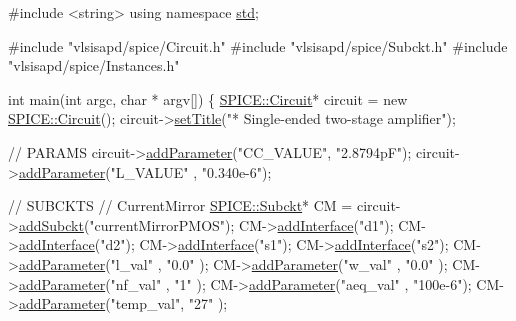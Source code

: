 \begin{DoxyCodeInclude}
\textcolor{preprocessor}{#include <string>}
\textcolor{keyword}{using namespace }\hyperlink{namespacestd}{std};

\textcolor{preprocessor}{#include "vlsisapd/spice/Circuit.h"}
\textcolor{preprocessor}{#include "vlsisapd/spice/Subckt.h"}
\textcolor{preprocessor}{#include "vlsisapd/spice/Instances.h"}

\textcolor{keywordtype}{int} main(\textcolor{keywordtype}{int} argc, \textcolor{keywordtype}{char} * argv[]) \{
    \hyperlink{class_s_p_i_c_e_1_1_circuit}{SPICE::Circuit}* circuit = \textcolor{keyword}{new} \hyperlink{class_s_p_i_c_e_1_1_circuit}{SPICE::Circuit}();
    circuit->\hyperlink{class_s_p_i_c_e_1_1_circuit_a798df9ebd558e22c85eeceb5202e3123}{setTitle}(\textcolor{stringliteral}{"* Single-ended two-stage amplifier"});

    \textcolor{comment}{// PARAMS}
    circuit->\hyperlink{class_s_p_i_c_e_1_1_circuit_ab3ab147a16bc490ce96db905a4ca271c}{addParameter}(\textcolor{stringliteral}{"CC\_VALUE"}, \textcolor{stringliteral}{"2.8794pF"});
    circuit->\hyperlink{class_s_p_i_c_e_1_1_circuit_ab3ab147a16bc490ce96db905a4ca271c}{addParameter}(\textcolor{stringliteral}{"L\_VALUE"} , \textcolor{stringliteral}{"0.340e-6"});

    \textcolor{comment}{// SUBCKTS}
    \textcolor{comment}{// CurrentMirror}
    \hyperlink{class_s_p_i_c_e_1_1_subckt}{SPICE::Subckt}* CM = circuit->\hyperlink{class_s_p_i_c_e_1_1_circuit_a0d1352e46d4537ce1e5f651de40e91a6}{addSubckt}(\textcolor{stringliteral}{"currentMirrorPMOS"});
    CM->\hyperlink{class_s_p_i_c_e_1_1_subckt_ac162264683fa3d9b3384d3e8cc291fa2}{addInterface}(\textcolor{stringliteral}{"d1"});
    CM->\hyperlink{class_s_p_i_c_e_1_1_subckt_ac162264683fa3d9b3384d3e8cc291fa2}{addInterface}(\textcolor{stringliteral}{"d2"});
    CM->\hyperlink{class_s_p_i_c_e_1_1_subckt_ac162264683fa3d9b3384d3e8cc291fa2}{addInterface}(\textcolor{stringliteral}{"s1"});
    CM->\hyperlink{class_s_p_i_c_e_1_1_subckt_ac162264683fa3d9b3384d3e8cc291fa2}{addInterface}(\textcolor{stringliteral}{"s2"});
    CM->\hyperlink{class_s_p_i_c_e_1_1_subckt_ab3ab147a16bc490ce96db905a4ca271c}{addParameter}(\textcolor{stringliteral}{"l\_val"}   , \textcolor{stringliteral}{"0.0"}   );
    CM->\hyperlink{class_s_p_i_c_e_1_1_subckt_ab3ab147a16bc490ce96db905a4ca271c}{addParameter}(\textcolor{stringliteral}{"w\_val"}   , \textcolor{stringliteral}{"0.0"}   );
    CM->\hyperlink{class_s_p_i_c_e_1_1_subckt_ab3ab147a16bc490ce96db905a4ca271c}{addParameter}(\textcolor{stringliteral}{"nf\_val"}  , \textcolor{stringliteral}{"1"}     );
    CM->\hyperlink{class_s_p_i_c_e_1_1_subckt_ab3ab147a16bc490ce96db905a4ca271c}{addParameter}(\textcolor{stringliteral}{"aeq\_val"} , \textcolor{stringliteral}{"100e-6"});
    CM->\hyperlink{class_s_p_i_c_e_1_1_subckt_ab3ab147a16bc490ce96db905a4ca271c}{addParameter}(\textcolor{stringliteral}{"temp\_val"}, \textcolor{stringliteral}{"27"}    );


\end{DoxyCodeInclude}
